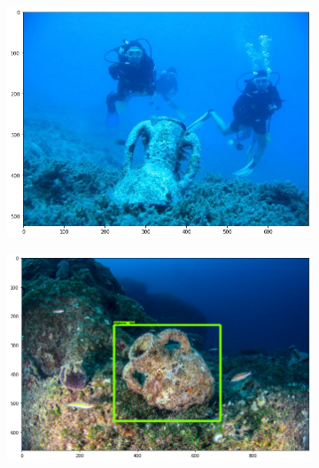 \documentclass[a4paper, 11pt, oneside]{article}
\begin{document}
\begin{figure}[ht]
  \centering
  \begin{subfigure}[ht]{0.4\textwidth}
      \centering
      \includegraphics[width=\textwidth]{val_1.png}
  \end{subfigure}
  \begin{subfigure}[ht]{0.4\textwidth}
      \centering
      \includegraphics[width=\textwidth]{val_6.png}
  \end{subfigure}
  \bigskip
  \begin{subfigure}[ht]{0.4\textwidth}
      \centering

\end{subfigure}
\end{figure}
\end{document}
